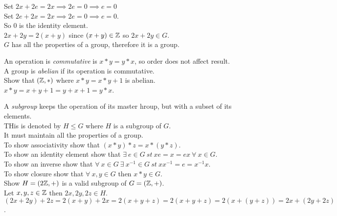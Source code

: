 \documentclass[11pt,a4paper]{article}
\begin{document}
Set $2x + 2e = 2x \implies 2e = 0 \implies e=0$\\
Set $2e+2x=2x \implies 2e = 0 \implies e = 0$.\\
So $0$ is the identity element.\\

$2x + 2y = 2(x+y)$ since $(x+y) \in \mathbb{Z}$ so $2x+2y \in G$.\\

$G$ has all the properties of a group, therefore it is a group.\\


An operation is \textit{commutative} is $x * y = y * x$, so order does not affect result.\\
A group is \textit{abelian} if its operation is commutative.\\

Show that $(\mathbb{Z}, *)$ where $x * y = x*y+1$ is abelian.\\
$x*y=x+y+1=y+x+1=y*x$.\\


A \textit{subgroup} keeps the operation of its master hroup, but with a subset of its elements.\\
THis is denoted by $H \leq G$ where $H$ is a subgroup of $G$.\\
It must maintain all the properties of a group.\\

To show associativity show that $(x * y) * z = x * (y * z)$.\\
To show an identity element show that $\exists\ e \in G\ st\ xe = x = ex\ \forall\ x \in G$.\\
To show an inverse show that $\forall\ x \in G\ \exists\ x^{-1} \in G\ st\ xx^{-1} = e = x^{-1}x$.\\
To show closure show that $\forall\ x, y \in G$ then $x * y \in G$.\\

Show $H=(2\mathbb{Z}, +)$ is a valid subgroup of $G=(\mathbb{Z}, +)$.\\

Let $x, y, z \in \mathbb{Z}$ then $2x, 2y, 2z \in H$.\\
$(2x + 2y) + 2z = 2(x+y)+2x=2(x+y+z)=2(x+y+z)=2(x+(y+z))=2x+(2y+2z)$.\\
\end{document}
